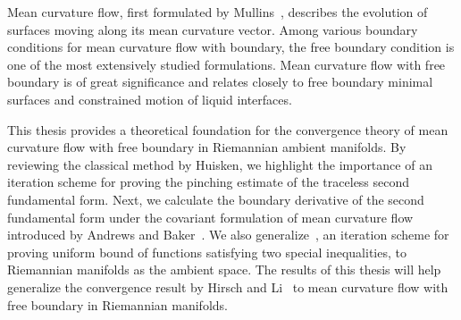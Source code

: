 
Mean curvature flow, first formulated by Mullins~\cite{mullins_twodimensional_1956}, describes the evolution of surfaces moving along its mean curvature vector. Among various boundary conditions for mean curvature flow with boundary, the free boundary condition is one of the most extensively studied formulations. Mean curvature flow with free boundary is of great significance and relates closely to free boundary minimal surfaces and constrained motion of liquid interfaces.

This thesis provides a theoretical foundation for the convergence theory of mean curvature flow with free boundary in Riemannian ambient manifolds. By reviewing the classical method by Huisken\cite{huisken_flow_1984}, we highlight the importance of an iteration scheme for proving the pinching estimate of the traceless second fundamental form. Next, we calculate the boundary derivative of the second fundamental form under the covariant formulation of mean curvature flow introduced by Andrews and Baker~\cite{andrews_mean_2010}. We also generalize~\cite[Theorem 3.1]{edelen_convexity_2016}, an iteration scheme for proving uniform bound of functions satisfying two special inequalities, to Riemannian manifolds as the ambient space. The results of this thesis will help generalize the convergence result by Hirsch and Li~\cite{hirsch2020contracting} to mean curvature flow with free boundary in Riemannian manifolds.


